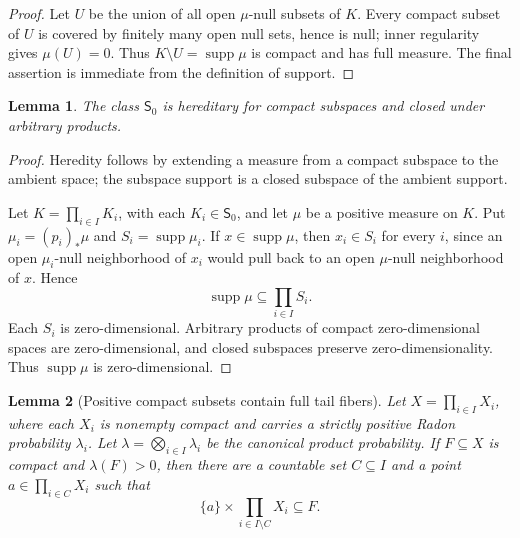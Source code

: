 \documentclass[11pt]{article}
\newtheorem{lemma}{Lemma}
\newcommand{\Szero}{\mathsf S_0}
\newcommand{\supp}{\operatorname{supp}}
\begin{document}
\begin{proof}
Let \(U\) be the union of all open \(\mu\)-null subsets of \(K\).  Every compact
subset of \(U\) is covered by finitely many open null sets, hence is null; inner
regularity gives \(\mu(U)=0\).  Thus \(K\setminus U=\supp\mu\) is compact and
has full measure.  The final assertion is immediate from the definition of
support.
\end{proof}

\begin{lemma}
The class \(\Szero\) is hereditary for compact subspaces and closed under
arbitrary products.
\end{lemma}

\begin{proof}
Heredity follows by extending a measure from a compact subspace to the ambient
space; the subspace support is a closed subspace of the ambient support.

Let \(K=\prod_{i\in I}K_i\), with each \(K_i\in\Szero\), and let \(\mu\) be a
positive measure on \(K\).  Put \(\mu_i=(p_i)_*\mu\) and \(S_i=\supp\mu_i\).
If \(x\in\supp\mu\), then \(x_i\in S_i\) for every \(i\), since an open
\(\mu_i\)-null neighborhood of \(x_i\) would pull back to an open \(\mu\)-null
neighborhood of \(x\).  Hence
\[
  \supp\mu\subseteq\prod_{i\in I}S_i .
\]
Each \(S_i\) is zero-dimensional.  Arbitrary products of compact
zero-dimensional spaces are zero-dimensional, and closed subspaces preserve
zero-dimensionality.  Thus \(\supp\mu\) is zero-dimensional.
\end{proof}

\begin{lemma}[Positive compact subsets contain full tail fibers]
Let \(X=\prod_{i\in I}X_i\), where each \(X_i\) is nonempty compact and carries a
strictly positive Radon probability \(\lambda_i\).  Let
\(\lambda=\bigotimes_{i\in I}\lambda_i\) be the canonical product probability.
If \(F\subseteq X\) is compact and \(\lambda(F)>0\), then there are a countable
set \(C\subseteq I\) and a point \(a\in\prod_{i\in C}X_i\) such that
\[
  \{a\}\times\prod_{i\in I\setminus C}X_i\subseteq F .
\]
\end{lemma}
\end{document}
